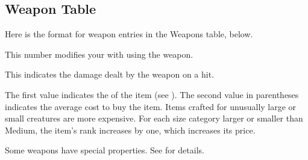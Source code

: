   \subsection{Weapon Table}
    Here is the format for weapon entries in the Weapons table, below.

     This number modifies your  with  using the weapon.

     This  indicates the damage dealt by the weapon on a hit.

     The first value indicates the  of the item (see ).
    The second value in parentheses indicates the average cost to buy the item.
    Items crafted for unusually large or small creatures are more expensive.
    For each size category larger or smaller than Medium, the item's rank increases by one, which increases its price.

     Some weapons have special properties. See  for details.

